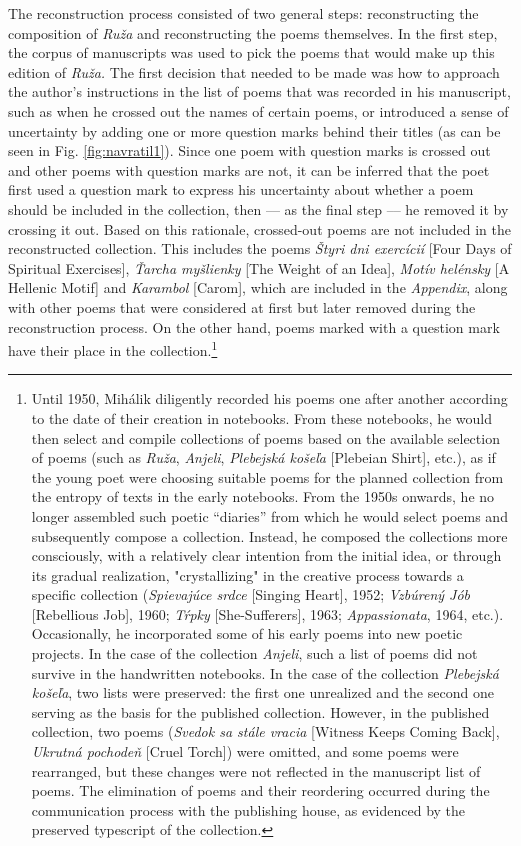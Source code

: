 \begin{paper}
The reconstruction process consisted of two general steps:
reconstructing the composition of \emph{Ruža} and reconstructing the
poems themselves. In the first step, the corpus of manuscripts was used
to pick the poems that would make up this edition of \emph{Ruža.} The
first decision that needed to be made was how to approach the author's
instructions in the list of poems that was recorded in his manuscript, such as when he crossed out the names
of certain poems, or introduced a sense of uncertainty by adding one or more
question marks behind their titles (as can be seen in Fig. \ref{fig:navratil1}). Since one poem with question
marks is crossed out and other poems with question marks are not, it can
be inferred that the poet first used a question mark to express his
uncertainty about whether a poem should be included in the collection,
then –– as the final step –– he removed it by crossing it out.
Based on this rationale, crossed-out poems are not included in the reconstructed
collection. This includes the poems \emph{Štyri dni exercícií} [Four
Days of Spiritual Exercises], \emph{Ťarcha myšlienky} [The Weight of an
Idea], \emph{Motív helénsky} [A Hellenic Motif] and \emph{Karambol}
[Carom], which are included in the \emph{Appendix}, along with other
poems that were considered at first but later removed during the
reconstruction process. On the other hand, poems marked with a question
mark have their place in the collection.\footnote{Until 1950, Mihálik
  diligently recorded his poems one after another according to the date
  of their creation in notebooks. From these notebooks, he would then
  select and compile collections of poems based on the available
  selection of poems (such as \emph{Ruža}, \emph{Anjeli},
  \emph{Plebejská košeľa} [Plebeian Shirt], etc.), as if the young poet
  were choosing suitable poems for the planned collection from the
  entropy of texts in the early notebooks. From the 1950s onwards, he no
  longer assembled such poetic ``diaries'' from which he would select
  poems and subsequently compose a collection. Instead, he composed the
  collections more consciously, with a relatively clear intention from
  the initial idea, or through its gradual realization, "crystallizing"
  in the creative process towards a specific collection
  (\emph{Spievajúce srdce} [Singing Heart], 1952; \emph{Vzbúrený Jób}
  [Rebellious Job], 1960; \emph{Tŕpky} [She-Sufferers], 1963;
  \emph{Appassionata}, 1964, etc.). Occasionally, he incorporated some
  of his early poems into new poetic projects. In the case of the
  collection \emph{Anjeli}, such a list of poems did not survive in the
  handwritten notebooks. In the case of the collection \emph{Plebejská
  košeľa}, two lists were preserved: the first one unrealized and the
  second one serving as the basis for the published collection. However,
  in the published collection, two poems (\emph{Svedok sa stále vracia}
  [Witness Keeps Coming Back], \emph{Ukrutná pochodeň} [Cruel Torch])
  were omitted, and some poems were rearranged, but these changes were
  not reflected in the manuscript list of poems. The elimination of
  poems and their reordering occurred during the communication process
  with the publishing house, as evidenced by the preserved typescript of
  the collection.}


\end{paper}
